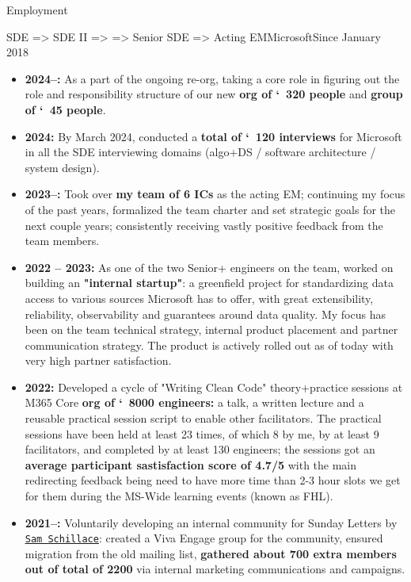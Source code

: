 \documentclass[calibri]{mcdowellcv}
\newcommand{\ultthref}[2]{\href{#1}{\underline{\texttt{#2}}}}
\begin{document}
	\makeheader
	
	\begin{cvsection}{Employment}
		\begin{cvsubsection}[2]{SDE => SDE II => \linebreak => Senior SDE => Acting EM}{Microsoft}{Since January 2018}			
			\begin{itemize}
				\item \textbf{2024--:} As a part of the ongoing re-org, taking a core role in figuring out the role and responsibility structure of our new \textbf{org of \char`~320 people} and \textbf{group of \char`~45 people}.
				\item \textbf{2024:} By March 2024, conducted a \textbf{total of \char`~120 interviews} for Microsoft in all the SDE interviewing domains (algo+DS / software architecture / system design).
				\item \textbf{2023--:} Took over \textbf{my team of 6 ICs} as the acting EM; continuing my focus of the past years, formalized the team charter and set strategic goals for the next couple years; consistently receiving vastly positive feedback from the team members.
				\item \textbf{2022 -- 2023:} As one of the two Senior+ engineers on the team, worked on building an \textbf{"internal startup"}: a greenfield project for standardizing data access to various sources Microsoft has to offer, with great extensibility, reliability, observability and guarantees around data quality. My focus has been on the team technical strategy, internal product placement and partner communication strategy. The product is actively rolled out as of today with very high partner satisfaction.
				\item \textbf{2022:} Developed a cycle of "Writing Clean Code" theory+practice sessions at M365 Core \textbf{org of \char`~8000 engineers:} a talk, a written lecture and a reusable practical session script to enable other facilitators. The practical sessions have been held at least 23 times, of which 8 by me, by at least 9 facilitators, and completed by at least 130 engineers; the sessions got an \textbf{average participant sastisfaction score of 4.7/5} with the main redirecting feedback being need to have more time than 2-3 hour slots we get for them during the MS-Wide learning events (known as FHL).
				\item \textbf{2021--:} Voluntarily developing an internal community for Sunday Letters by \ultthref{https://www.microsoft.com/en-us/behind-the-tech/sam-schillace-deputy-cto-microsoft}{Sam Schillace}: created a Viva Engage group for the community, ensured migration from the old mailing list, \textbf{gathered about 700 extra members out of total of 2200} via internal marketing communications and campaigns.

\end{itemize}
\end{cvsubsection}
\end{cvsection}
\end{document}
